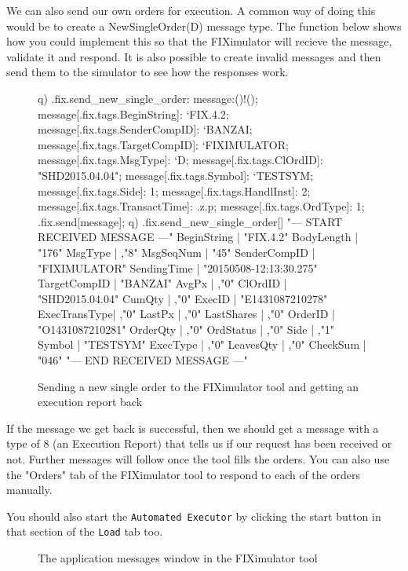 We can also send our own orders for execution. A common way of doing this would be to create a NewSingleOrder(D) message type. The function below shows how you could implement this so that
the FIXimulator will recieve the message, validate it and respond. It is also possible to create invalid messages and then send them to the simulator to see how the responses work.

\begin{figure}[H]
\begin{qcode}
q) .fix.send_new_single_order:{
	message:()!();
	message[.fix.tags.BeginString]: `FIX.4.2;
	message[.fix.tags.SenderCompID]: `BANZAI;
	message[.fix.tags.TargetCompID]: `FIXIMULATOR;
	message[.fix.tags.MsgType]: `D;
	message[.fix.tags.ClOrdID]: "SHD2015.04.04";
	message[.fix.tags.Symbol]: `TESTSYM;
	message[.fix.tags.Side]: 1;
	message[.fix.tags.HandlInst]: 2;
	message[.fix.tags.TransactTime]: .z.p;
	message[.fix.tags.OrdType]: 1;
	.fix.send[message]; }
q) .fix.send_new_single_order[]
"--- START RECEIVED MESSAGE ---"
BeginString  | "FIX.4.2"
BodyLength   | "176"
MsgType      | ,"8"
MsgSeqNum    | "45"
SenderCompID | "FIXIMULATOR"
SendingTime  | "20150508-12:13:30.275"
TargetCompID | "BANZAI"
AvgPx        | ,"0"
ClOrdID      | "SHD2015.04.04"
CumQty       | ,"0"
ExecID       | "E1431087210278"
ExecTransType| ,"0"
LastPx       | ,"0"
LastShares   | ,"0"
OrderID      | "O1431087210281"
OrderQty     | ,"0"
OrdStatus    | ,"0"
Side         | ,"1"
Symbol       | "TESTSYM"
ExecType     | ,"0"
LeavesQty    | ,"0"
CheckSum     | "046"
"---  END RECEIVED MESSAGE  ---"
\end{qcode}
\caption{Sending a new single order to the FIXimulator tool and getting an execution report back}
\end{figure}

If the message we get back is successful, then we should get a message with a type of 8 (an Execution Report) that tells us if our request has been received or not. Further messages will follow once the
tool fills the orders. You can also use the "Orders" tab of the FIXimulator tool to respond to each of
the orders manually.

You should also start the \verb|Automated Executor| by clicking the start button in that section of the \verb|Load| tab too.

\begin{figure}[H]
\centering
{}
\caption{The application messages window in the FIXimulator tool}
\label{fig:application-messages}
\end{figure}

